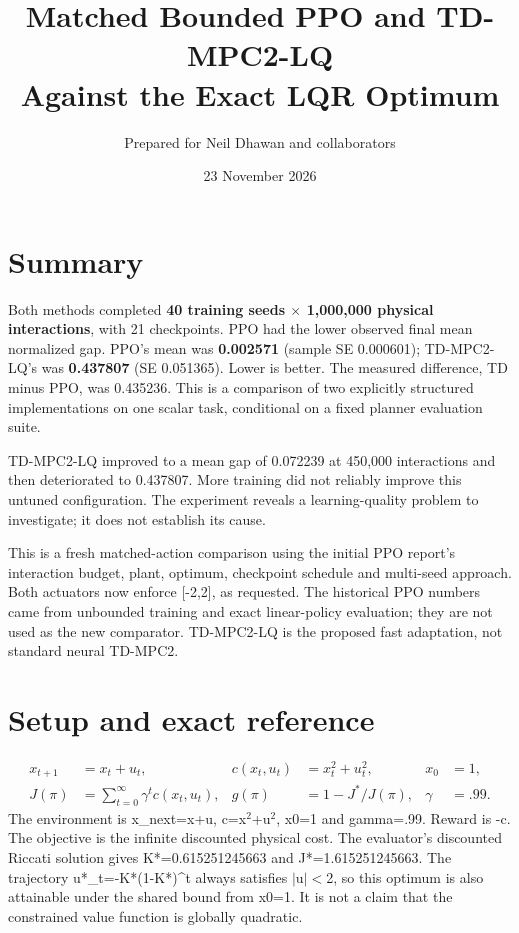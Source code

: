 \documentclass[11pt]{article}
\title{Matched Bounded PPO and TD-MPC2-LQ\\Against the Exact LQR Optimum}
\author{Prepared for Neil Dhawan and collaborators}
\date{23 November 2026}
\begin{document}
\maketitle


\section{Summary}

Both methods completed \textbf{40 training seeds $\times$ 1,000,000 physical interactions}, with 21 checkpoints. PPO had the lower observed final mean normalized gap. PPO's mean was \textbf{0.002571} (sample SE 0.000601); TD-MPC2-LQ's was \textbf{0.437807} (SE 0.051365). Lower is better. The measured difference, TD minus PPO, was 0.435236. This is a comparison of two explicitly structured implementations on one scalar task, conditional on a fixed planner evaluation suite.

TD-MPC2-LQ improved to a mean gap of 0.072239 at 450,000 interactions and then deteriorated to 0.437807. More training did not reliably improve this untuned configuration. The experiment reveals a learning-quality problem to investigate; it does not establish its cause.

This is a fresh matched-action comparison using the initial PPO report's interaction budget, plant, optimum, checkpoint schedule and multi-seed approach. Both actuators now enforce [-2,2], as requested. The historical PPO numbers came from unbounded training and exact linear-policy evaluation; they are not used as the new comparator. TD-MPC2-LQ is the proposed fast adaptation, not standard neural TD-MPC2.

\section{Setup and exact reference}

\begin{align*}
x_{t+1}&=x_t+u_t,& c(x_t,u_t)&=x_t^2+u_t^2,& x_0&=1,\\
J(\pi)&=\sum_{t=0}^{\infty}\gamma^t c(x_t,u_t),&
g(\pi)&=1-J^*/J(\pi),& \gamma&=.99.
\end{align*}
The environment is x\_next=x+u, c=x$^2$+u$^2$, x0=1 and gamma=.99. Reward is -c. The objective is the infinite discounted physical cost. The evaluator's discounted Riccati solution gives K*=0.615251245663 and J*=1.615251245663. The trajectory u*\_t=-K*(1-K*)\textasciicircum{}t always satisfies $|$u$|$$<$2, so this optimum is also attainable under the shared bound from x0=1. It is not a claim that the constrained value function is globally quadratic.
\end{document}
